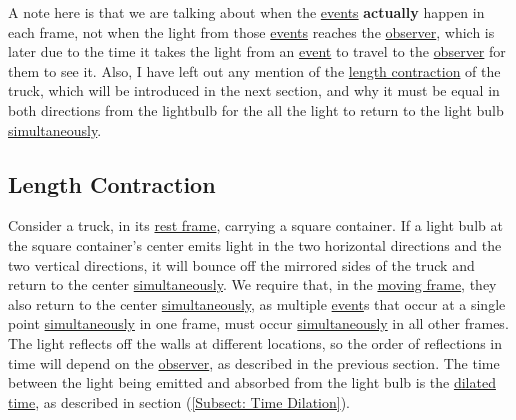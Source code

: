 A note here is that we are talking about when the \hyperlink{def-event}{events} \textbf{actually} happen in each frame, not when the light from those \hyperlink{def-event}{events} reaches the \hyperlink{def-observer}{observer}, which is later due to the time it takes the light from an \hyperlink{def-event}{event} to travel to the \hyperlink{def-observer}{observer} for them to see it.
Also, I have left out any mention of the \hyperlink{def-length-contraction}{length contraction} of the truck, which will be introduced in the next section, and why it must be equal in both directions from the lightbulb for the all the light to return to the light bulb \hyperlink{def-simultaneity}{simultaneously}.


\subsection{Length Contraction} \label{subsect: Length Contraction}

Consider a truck, in its \hyperlink{def-proper-frame}{rest frame}, carrying a square container.
If a light bulb at the square container's center emits light in the two horizontal directions and the two vertical directions, it will bounce off the mirrored sides of the truck and return to the center \hyperlink{def-simultaneity}{simultaneously}.
We require that, in the \hyperlink{def-Moving-Frame}{moving frame}, they also return to the center \hyperlink{def-simultaneity}{simultaneously}, as multiple \hyperlink{def-event}{event}s that occur at a single point \hyperlink{def-simultaneity}{simultaneously} in one frame, must occur \hyperlink{def-simultaneity}{simultaneously} in all other frames.
The light reflects off the walls at different locations, so the order of reflections in time will depend on the \hyperlink{def-observer}{observer}, as described in the previous section.
The time between the light being emitted and absorbed from the light bulb is the \hyperlink{def-time-dilation}{dilated time}, as described in section (\ref{Subsect: Time Dilation}).

